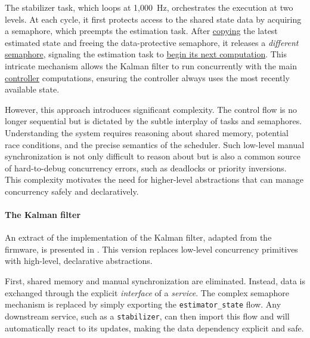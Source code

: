 The stabilizer task, which loops at 1,000~Hz, orchestrates the execution at two levels. At each
cycle, it first protects access to the shared state data by acquiring a semaphore, which preempts
the estimation task. After
\href{https://github.com/bitcraze/crazyflie-firmware/blob/b9d676aa3544b68eea17d11b0fbec437da909878/src/modules/src/estimator/estimator_kalman.c#L293}
{copying} the latest estimated state and freeing the data-protective semaphore, it releases a
\emph{different}
\href{https://github.com/bitcraze/crazyflie-firmware/blob/b9d676aa3544b68eea17d11b0fbec437da909878/src/modules/src/estimator/estimator_kalman.c#L296}
{semaphore}, signaling the estimation task to
\href{https://github.com/bitcraze/crazyflie-firmware/blob/b9d676aa3544b68eea17d11b0fbec437da909878/src/modules/src/estimator/estimator_kalman.c#L223}
{begin its next computation}. This intricate mechanism allows the Kalman filter to run concurrently
with the main
\href{https://github.com/bitcraze/crazyflie-firmware/blob/b9d676aa3544b68eea17d11b0fbec437da909878/src/modules/src/stabilizer.c#L349}
{controller} computations, ensuring the controller always uses the most recently available state.

However, this approach introduces significant complexity. The control flow is no longer sequential
but is dictated by the subtle interplay of tasks and semaphores. Understanding the system requires
reasoning about shared memory, potential race conditions, and the precise semantics of the
scheduler. Such low-level manual synchronization is not only difficult to reason about but is also a
common source of hard-to-debug concurrency errors, such as deadlocks or priority inversions. This
complexity motivates the need for higher-level abstractions that can manage concurrency safely and
declaratively.

\paragraph{The \GRust Kalman filter}
An extract of the \GRust implementation of the Kalman filter, adapted from the \Ci firmware, is
presented in . This version replaces low-level
concurrency primitives with high-level, declarative abstractions.

First, shared memory and manual synchronization are eliminated. Instead, data is exchanged through
the explicit \emph{interface} of a \emph{service}. The complex semaphore mechanism is replaced by
simply exporting the \texttt{estimator\_state} flow. Any downstream service, such as a
\texttt{stabilizer}, can then import this flow and will automatically react to its updates, making
the data dependency explicit and safe.

